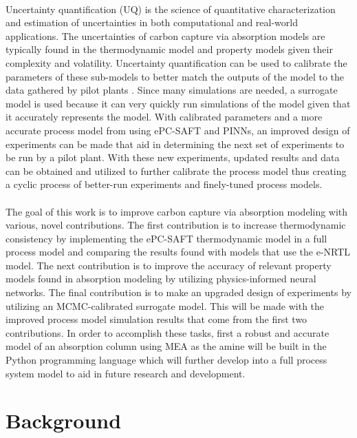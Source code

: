 \documentclass[12pt, letterpaper]{article}
\begin{document}
\paragraph{}
Uncertainty quantification (UQ) is the science of quantitative characterization and estimation of uncertainties in both computational and real-world applications. The uncertainties of carbon capture via absorption models are typically found in the thermodynamic model and property models given their complexity and volatility. Uncertainty quantification can be used to calibrate the parameters of these sub-models to better match the outputs of the model to the data gathered by pilot plants \cite{Morgan2018}. Since many simulations are needed, a surrogate model is used because it can very quickly run simulations of the model given that it accurately represents the model. With calibrated parameters and a more accurate process model from using ePC-SAFT and PINNs, an improved design of experiments can be made that aid in determining the next set of experiments to be run by a pilot plant. With these new experiments, updated results and data can be obtained and utilized to further calibrate the process model thus creating a cyclic process of better-run experiments and finely-tuned process models.

\paragraph{}
The goal of this work is to improve carbon capture via absorption modeling with various, novel contributions. The first contribution is to increase thermodynamic consistency by implementing the ePC-SAFT thermodynamic model in a full process model and comparing the results found with models that use the e-NRTL model. The next contribution is to improve the accuracy of relevant property models found in absorption modeling by utilizing physics-informed neural networks.  The final contribution is to make an upgraded design of experiments by utilizing an MCMC-calibrated surrogate model. This will be made with the improved process model simulation results that come from the first two contributions.  In order to accomplish these tasks, first a robust and accurate model of an absorption column using MEA as the amine will be built in the Python programming language which will further develop into a full process system model to aid in future research and development.

\newpage

\section{Background}
\end{document}
